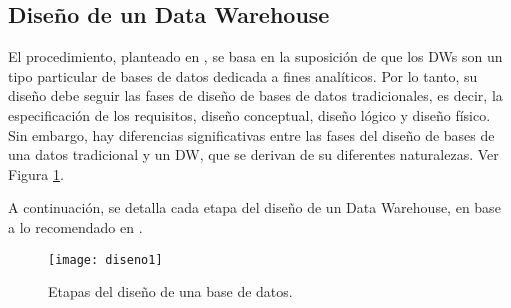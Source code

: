 \documentclass[a4paper,11pt]{article}
\begin{document}
    \subsection{Diseño de un Data Warehouse}
    El procedimiento, planteado en \cite{VaismanZimanyi14}, se basa en la suposición de que los DWs son un tipo particular de bases de datos dedicada a fines analíticos.
    Por lo tanto, su diseño debe seguir las fases de diseño de bases de datos tradicionales, es decir, la especificación de los requisitos, diseño conceptual, diseño 
    lógico y diseño físico. Sin embargo, hay diferencias significativas entre las fases del diseño de bases de una datos tradicional y un DW, que se derivan de su
    diferentes naturalezas. Ver Figura \ref{etapasDiseño}.
    
    A continuación, se detalla cada etapa del diseño de un Data Warehouse, en base a lo recomendado en \cite{VaismanZimanyi14}.
    
    \begin{figure}
      \texttt{[image: diseno1]}  
      \caption{Etapas del diseño de una base de datos.}
      \label{etapasDiseño}
    \end{figure}
    
\end{document}
